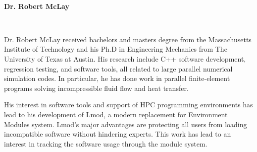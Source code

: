 \documentclass[12pt]{article}
\begin{document}
~~

\noindent
{\bf{}Dr. Robert McLay}

~~

\noindent
Dr. Robert McLay received bachelors and masters degree from the Massachusetts 
Institute of Technology and his Ph.D in Engineering Mechanics from The University 
of Texas at Austin.  His research include C++ software development, regression 
testing, and software tools, all related to large parallel numerical simulation codes.  
In particular, he has done work in parallel finite-element programs solving 
incompressible fluid flow and heat transfer.

His interest in software tools and support of HPC programming environments has 
lead to his development of Lmod, a modern replacement for Environment Modules 
system.  Lmod's major advantages are protecting all users from loading incompatible 
software without hindering experts.  This work has lead to an interest in tracking the 
software usage through the module system.

\noindent

\end{document}
